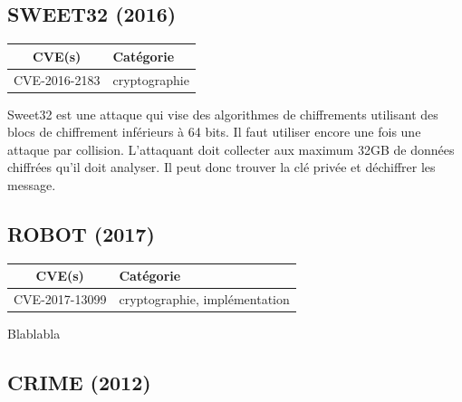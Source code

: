 

\subsection{SWEET32 (2016)}

\begin{tabularx}{0.96\textwidth}{|c|X|}
  \hline
  \textbf{CVE(s)} & \textbf{Catégorie} \\
  \hline
  CVE-2016-2183 & cryptographie \\
  \hline
\end{tabularx}

\vspace{1em}

Sweet32 est une attaque qui vise des algorithmes de chiffrements utilisant des blocs de chiffrement inférieurs à 64 bits. Il faut utiliser encore une fois une attaque par collision. L'attaquant doit collecter aux maximum 32GB de données chiffrées qu'il doit analyser. Il peut donc trouver la clé privée et déchiffrer les message\cite{sweet32}.




\subsection{ROBOT (2017)}

\begin{tabularx}{0.96\textwidth}{|c|X|}
  \hline
  \textbf{CVE(s)} & \textbf{Catégorie} \\
  \hline
  CVE-2017-13099 & cryptographie, implémentation \\
  \hline
\end{tabularx}

\vspace{1em}

Blablabla \cite{robot}




\subsection{CRIME (2012)}

